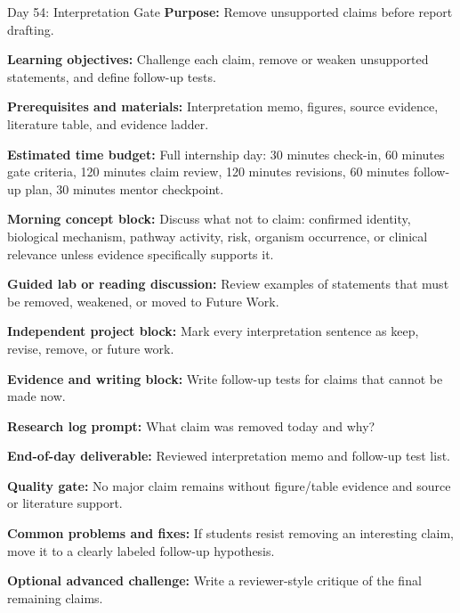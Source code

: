 \begin{dailybox}{Day 54: Interpretation Gate}
\textbf{Purpose:} Remove unsupported claims before report drafting.

\textbf{Learning objectives:} Challenge each claim, remove or weaken unsupported statements, and define follow-up tests.

\textbf{Prerequisites and materials:} Interpretation memo, figures, source evidence, literature table, and evidence ladder.

\textbf{Estimated time budget:} Full internship day: 30 minutes check-in, 60 minutes gate criteria, 120 minutes claim review, 120 minutes revisions, 60 minutes follow-up plan, 30 minutes mentor checkpoint.

\textbf{Morning concept block:} Discuss what not to claim: confirmed identity, biological mechanism, pathway activity, risk, organism occurrence, or clinical relevance unless evidence specifically supports it.

\textbf{Guided lab or reading discussion:} Review examples of statements that must be removed, weakened, or moved to Future Work.

\textbf{Independent project block:} Mark every interpretation sentence as keep, revise, remove, or future work.

\textbf{Evidence and writing block:} Write follow-up tests for claims that cannot be made now.

\textbf{Research log prompt:} What claim was removed today and why?

\textbf{End-of-day deliverable:} Reviewed interpretation memo and follow-up test list.

\textbf{Quality gate:} No major claim remains without figure/table evidence and source or literature support.

\textbf{Common problems and fixes:} If students resist removing an interesting claim, move it to a clearly labeled follow-up hypothesis.

\textbf{Optional advanced challenge:} Write a reviewer-style critique of the final remaining claims.
\end{dailybox}

